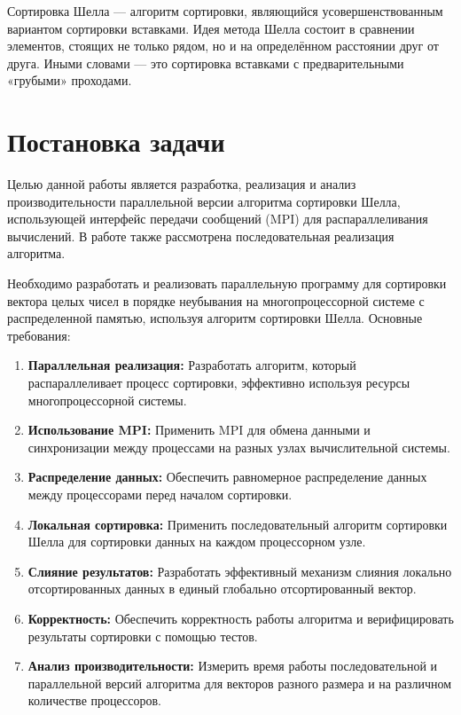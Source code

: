 \documentclass[12pt]{article}
\begin{document}
Сортировка Шелла — алгоритм сортировки, являющийся усовершенствованным вариантом сортировки вставками. Идея метода Шелла состоит в сравнении элементов, стоящих не только рядом, но и на определённом расстоянии друг от друга. Иными словами — это сортировка вставками с предварительными «грубыми» проходами.


\section{Постановка задачи}

\hspace*{1.25em} Целью данной работы является разработка, реализация и анализ производительности параллельной версии алгоритма сортировки Шелла, использующей интерфейс передачи сообщений (MPI) для распараллеливания вычислений. В работе также рассмотрена последовательная реализация алгоритма.

Необходимо разработать и реализовать параллельную программу для сортировки вектора целых чисел в порядке неубывания на многопроцессорной системе с распределенной памятью, используя алгоритм сортировки Шелла.
Основные требования:

\begin{enumerate}
    \item \textbf{Параллельная реализация:} Разработать алгоритм, который распараллеливает процесс сортировки, эффективно используя ресурсы многопроцессорной системы.
    \item \textbf{Использование MPI:} Применить MPI для обмена данными и синхронизации между процессами на разных узлах вычислительной системы.
    \item \textbf{Распределение данных:} Обеспечить равномерное распределение данных между процессорами перед началом сортировки.
    \item \textbf{Локальная сортировка:} Применить последовательный алгоритм сортировки Шелла для сортировки данных на каждом процессорном узле.
    \item \textbf{Слияние результатов:} Разработать эффективный механизм слияния локально отсортированных данных в единый глобально отсортированный вектор.
    \item \textbf{Корректность:} Обеспечить корректность работы алгоритма и верифицировать результаты сортировки с помощью тестов.
    \item \textbf{Анализ производительности:} Измерить время работы последовательной и параллельной версий алгоритма для векторов разного размера и на различном количестве процессоров.
\end{enumerate}
\end{document}

